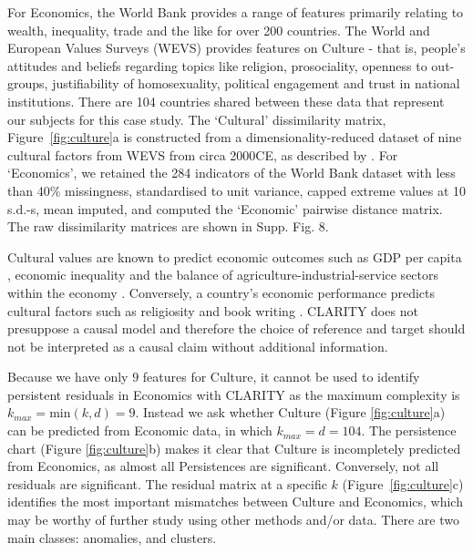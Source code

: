 \documentclass[a4]{article}
\newcommand{\+}[1]{\mathbf{#1}}
\begin{document}
For Economics, the World Bank \cite{CIA2018} provides a range of  features primarily relating to wealth, inequality, trade and the like for over 200 countries. The World and European Values Surveys (WEVS) \cite{WVS2017, EVS2011} provides features on Culture - that is, people's attitudes and beliefs regarding topics like religion, prosociality, openness to out-groups, justifiability of homosexuality, political engagement and trust in national institutions. There are 104 countries shared between these data that represent our subjects for this case study. The `Cultural' dissimilarity matrix, Figure~\ref{fig:culture}a is constructed from a dimensionality-reduced dataset of nine cultural factors from WEVS from circa 2000CE, as described by \cite{ruck2018religious}. For `Economics', we retained  the 284 indicators of the World Bank dataset with less than 40\% missingness, standardised to unit variance, capped extreme values at 10 s.d.-s, mean imputed, and computed the `Economic' pairwise distance matrix.  The raw dissimilarity matrices are shown in Supp. Fig. 8.

Cultural values are known to predict economic outcomes such as GDP per capita \cite{Gorodnichenko2016, ruck2018religious}, economic inequality \cite{Nikolaev2017} and the balance of agriculture-industrial-service sectors within the economy \cite{Inglehart2005a}. Conversely, a country's economic performance predicts cultural factors such as religiosity \cite{sinding_bentzen_acts_2019} and book writing \cite{bentley_books_2014}. CLARITY does not presuppose a causal model and therefore the choice of reference and target should not be interpreted as a causal claim without additional information.

Because we have only $9$ features for Culture, it cannot be used to identify persistent residuals in Economics with CLARITY as the maximum complexity is $k_{max}=\mathrm{min}(k,d)=9$. Instead we ask whether Culture (Figure \ref{fig:culture}a) can be predicted from Economic data, in which $k_{max}=d=104$. The persistence chart (Figure \ref{fig:culture}b) makes it clear that Culture is incompletely predicted from Economics, as almost all Persistences are significant. %
Conversely, not all residuals are significant. The residual matrix at a specific $k$ (Figure~\ref{fig:culture}c) identifies the most important mismatches between Culture and Economics, which may be worthy of further study using other methods and/or data. There are two main classes: anomalies, and clusters.
\end{document}
